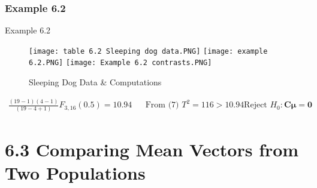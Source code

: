\documentclass[8pt]{beamer}
\begin{document}
\subsubsection{Example 6.2}
    \begin{frame}{Example 6.2}
        \begin{figure}
            \texttt{[image: table 6.2 Sleeping dog data.PNG]}
            \texttt{[image: example 6.2.PNG]}
            \texttt{[image: Example 6.2 contrasts.PNG]}
            \caption{Sleeping Dog Data \& Computations}
        \end{figure}
        
        \begin{align*}
            \frac{(19 - 1)(4 - 1)}{(19 - 4 + 1)}F_{3,16}(0.5) = 10.94 && \text{From (7) } T^{2} = 116 > 10.94 && \text{Reject } H_{0}:\mathbf{C\mu} = \mathbf{0}
        \end{align*}
        
    \end{frame}

\section{6.3 Comparing Mean Vectors from Two Populations}
\end{document}
